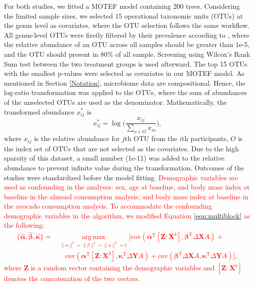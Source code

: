 \documentclass[smallextended]{svjour3}
\DeclareMathOperator*{\argmax}{arg\,max}
\newcommand{\trnp}{^\text{T}}
\newcommand{\bg}[1]{\textcolor{red}{#1}}
\begin{document}
For both studies, we fitted a MOTEF model containing 200 trees. Considering the limited sample sizes, we selected 15 operational taxonomic units (OTUs) at the genus level as covariates, where the OTU selection follows the same workflow. All genus-level OTUs were firstly filtered by their prevalence according to \cite{callahan2016bioconductor}, where the relative abundance of an OTU across all samples should be greater than 1e-5, and the OTU should present in 80\% of all sample. Screening using Wilcox's Rank Sum test between the two treatment groups is used afterward. The top 15 OTUs with the smallest p-values were selected as covariates in our MOTEF model. As mentioned in Section \ref{Notation}, microbiome data are compositional. Hence, the log-ratio transformation was applied to the OTUs, where the sum of abundances of the unselected OTUs are used as the denominator. Mathematically, the transformed abundance $x_{ij}^*$ is
\begin{equation*}
    x_{ij}^* = \log\Big(\frac{x_{ij}}{\sum\limits_{o \in O} x_{io}}\Big),    
\end{equation*}
where $x_{ij}$ is the relative abundance for $j$th OTU from the $i$th participants,
$O$ is the index set of OTUs that are not selected as the covariates. Due to the high sparsity of this dataset, a small number (1e-11) was added to the relative abundance to prevent infinite value during the transformation. Outcomes of the studies were standardized before the model fitting. \bg{Demographic variables are used as confounding in the analyses: sex, age at baseline, and body mass index at baseline in the almond consumption analysis, and body mass index at baseline in the avocado consumption analysis. To accommodate the confounding demographic variables in the algorithm, we modified Equation \eqref{eqn:multiblock} as the following:
\begin{align}
\{\bm{\widehat{\alpha}}, \bm{\widehat{\beta}}, \bm{\widehat{\kappa}}\} = & \argmax\limits_{\lVert\alpha\rVert^2 = \lVert\beta\rVert^2 = \lVert\kappa\rVert^2 = 1}
\Big[ \text{cov}( \bm \alpha\trnp \left[ \bm Z : \bm{X}^b\right], \bm \beta \trnp \Delta \bm{X} A ) + \nonumber \\ 
&\quad \text{cov} (\bm \alpha\trnp \left[ \bm Z : \bm{X}^b\right], \bm \kappa \trnp \Delta \bm{Y} A) +\text{cov}(\bm \beta\trnp \Delta \bm{X} A, \bm \kappa\trnp \Delta \bm{Y} A ) \Big], \label{eqn:multiblock2}
\end{align}
where $\bm Z$ is a random vector containing the demographic variables and $\left[\bm Z:\bm X^b\right]$ denotes the concatenation of the two vectors.
}
\end{document}
